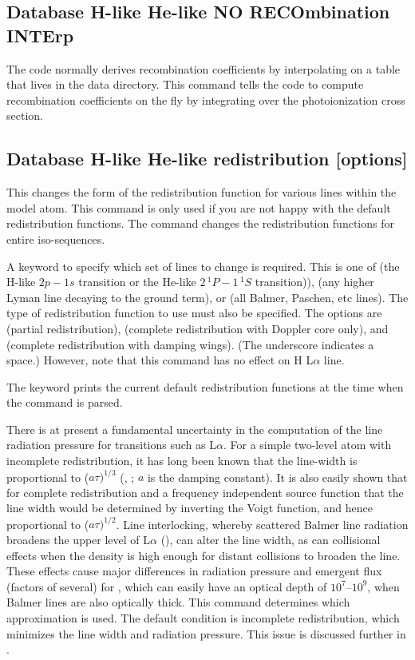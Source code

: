 \subsection{Database H-like \OR{} He-like NO RECOmbination INTErp}

The code normally derives recombination coefficients by interpolating
on a table that lives in the data directory.
This command tells the code
to compute recombination coefficients on the fly by integrating over the
photoionization cross section.

\subsection{Database H-like \OR{} He-like  redistribution [options]}

This changes the form of the redistribution function for various
lines within the model atom. This command is only used if you are
not happy with the default redistribution functions. The command
changes the redistribution functions for entire iso-sequences.

A keyword to specify which set of lines to change is required.
This is one of  (the H-like $2p - 1s$ transition or the He-like
$2\, ^1P - 1\, ^1S$ transition)),  (any higher Lyman line
decaying to the ground term), or 
(all Balmer, Paschen, etc lines).
The type of redistribution function to use must also be specified.
The options are  (partial redistribution),  (complete redistribution
with Doppler core only), and 
(complete redistribution with damping wings).
(The underscore indicates a space.)
However, note that this command has no effect on H L$\alpha$ line.

The keyword  prints the current default
redistribution functions at the time when the command is parsed.

There is at present a fundamental uncertainty in the computation of the
line radiation pressure for transitions such as L$\alpha $.
For a simple two-level
atom with incomplete redistribution, it has long been known that the
line-width is proportional to ($a\tau)^{1/3}$
(\citealp{Adams1972}, \citealp{Harrington1973}; $a$ is
the damping constant).  It is also easily shown that for complete
redistribution and a frequency independent source function that the line
width would be determined by inverting the Voigt function, and hence
proportional to ($a\tau)^{1/2}$.
Line interlocking, whereby scattered Balmer line
radiation broadens the upper level of L$\alpha$
(\citealp{Hubbard1985}), can
alter the line width, as can collisional effects when the density is high
enough for distant collisions to broaden the line.
These effects cause
major differences in radiation pressure and emergent flux (factors of
several) for \la, which can easily have an optical depth of
$10^7$--$10^9$, when
Balmer lines are also optically thick.  
This command determines which
approximation is used.
The default condition is incomplete redistribution,
which minimizes the line width and radiation pressure.  This issue is
discussed further in \citet{Elitzur1986}.

